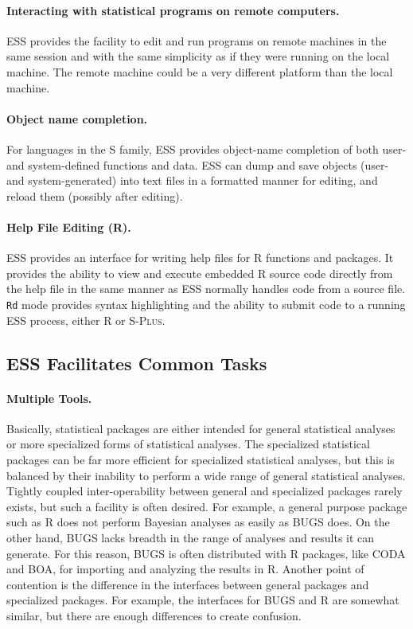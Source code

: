 \documentclass{article}
\newcommand*{\Splus}{\textsc{S-Plus}}
\newcommand{\stexttt}[1]{{\small\texttt{#1}}}
\begin{document}
\paragraph{Interacting with statistical programs on remote computers.}
ESS provides the facility to edit and run programs on remote machines
in the same session and with the same simplicity as if they were
running on the local machine.  The remote machine could be a very
different platform than the local machine.

\paragraph{Object name completion.}
For languages in the S family,
ESS provides object-name completion of both user- and
system-defined functions and data.  ESS can dump and save objects
(user- and system-generated) into text files in a formatted manner for
editing, and reload them (possibly after editing).

\paragraph{Help File Editing (R).}
ESS provides an interface for writing help files for R functions
and packages.  It provides the ability to view and execute embedded R
source code directly from the help file in the same manner as ESS
normally handles code from a source file.  \stexttt{Rd} mode provides
syntax highlighting and the ability to submit code to a running ESS
process, either R or \Splus.


\subsection{ESS Facilitates Common Tasks}
\label{sec:ess-facil-comm}

\paragraph{Multiple Tools.}
\label{sec:multiple-tools}

Basically, statistical packages are either intended for general
statistical analyses or more specialized forms of statistical analyses.
The specialized statistical packages can be far more efficient for
specialized statistical analyses, but this is balanced by their inability
to perform a wide range of general statistical analyses.  Tightly coupled
inter-operability between general and specialized packages rarely exists,
but such a facility is often desired.  For example, a general purpose
package such as R does not perform Bayesian analyses as easily as BUGS does.
On the other hand, BUGS lacks breadth in the range of analyses and results
it can generate.  For this reason, BUGS is often distributed with R packages,
like CODA and BOA, for importing and analyzing the results in R.  Another
point of contention is the difference in the interfaces between general
packages and specialized packages.  For example, the interfaces for BUGS
and R are somewhat similar, but there are enough differences to create confusion.
\end{document}
